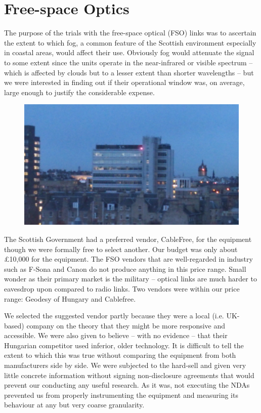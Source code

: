 
\section{Free-space Optics}
\label{sec:fso}

The purpose of the trials with the free-space optical (FSO) links was to
ascertain the extent to which fog, a common feature of the Scottish
environment especially in coastal areas, would affect their
use. Obviously fog would attenuate the signal to some extent since
the units operate in the near-infrared or visible spectrum -- which is
affected by clouds but to a lesser extent than shorter wavelengths --
but we were interested in finding out if their operational window was,
on average, large enough to justify the considerable expense.
\begin{figure}
  \includegraphics[width=\textwidth]{at-laser.jpg}
\end{figure}

The Scottish Government had a preferred vendor, CableFree, for the
equipment though we were formally free to select another. Our budget
was only about \pounds 10,000 for the equipment. The FSO vendors that
are well-regarded in industry such as F-Sona and Canon do not produce
anything in this price range. Small wonder as their primary market is
the military -- optical links are much harder to eavesdrop upon
compared to radio links. Two vendors were within our price range:
Geodesy of Hungary and Cablefree.

We selected the suggested vendor partly because they were a local
(i.e. UK-based) company on the theory that they might be more
responsive and accessible. We were also given to believe -- with no
evidence -- that their Hungarian competitor used inferior, older
technology. It is difficult to tell the extent to which this was
true without comparing the equipment from both manufacturers side by
side. We were subjected to the hard-sell and given very little
concrete information without signing non-disclosure agreements that
would prevent our conducting any useful research. As it was, not
executing the NDAs prevented us from properly instrumenting the
equipment and measuring its behaviour at any but very coarse
granularity.


